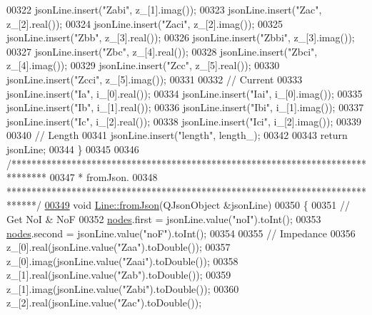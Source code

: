 \begin{DoxyCode}
00322   jsonLine.insert(\textcolor{stringliteral}{"Zabi"}, z\_[1].imag());
00323   jsonLine.insert(\textcolor{stringliteral}{"Zac"}, z\_[2].real());
00324   jsonLine.insert(\textcolor{stringliteral}{"Zaci"}, z\_[2].imag());
00325   jsonLine.insert(\textcolor{stringliteral}{"Zbb"}, z\_[3].real());
00326   jsonLine.insert(\textcolor{stringliteral}{"Zbbi"}, z\_[3].imag());
00327   jsonLine.insert(\textcolor{stringliteral}{"Zbc"}, z\_[4].real());
00328   jsonLine.insert(\textcolor{stringliteral}{"Zbci"}, z\_[4].imag());
00329   jsonLine.insert(\textcolor{stringliteral}{"Zcc"}, z\_[5].real());
00330   jsonLine.insert(\textcolor{stringliteral}{"Zcci"}, z\_[5].imag());
00331 
00332   \textcolor{comment}{// Current}
00333   jsonLine.insert(\textcolor{stringliteral}{"Ia"}, i\_[0].real());
00334   jsonLine.insert(\textcolor{stringliteral}{"Iai"}, i\_[0].imag());
00335   jsonLine.insert(\textcolor{stringliteral}{"Ib"}, i\_[1].real());
00336   jsonLine.insert(\textcolor{stringliteral}{"Ibi"}, i\_[1].imag());
00337   jsonLine.insert(\textcolor{stringliteral}{"Ic"}, i\_[2].real());
00338   jsonLine.insert(\textcolor{stringliteral}{"Ici"}, i\_[2].imag());
00339 
00340   \textcolor{comment}{// Length}
00341   jsonLine.insert(\textcolor{stringliteral}{"length"}, length\_);
00342 
00343   \textcolor{keywordflow}{return} jsonLine;
00344 \}
00345 
00346 \textcolor{comment}{/*******************************************************************************}
00347 \textcolor{comment}{ * fromJson.}
00348 \textcolor{comment}{ ******************************************************************************/}
\hypertarget{line_8cpp_source_l00349}{}\hyperlink{group___models_ga62623ad71df5279377cc69da90decc75}{00349} \textcolor{keywordtype}{void} \hyperlink{group___models_ga62623ad71df5279377cc69da90decc75}{Line::fromJson}(QJsonObject &jsonLine)
00350 \{
00351   \textcolor{comment}{// Get NoI & NoF}
00352   \hyperlink{class_line_afd17c40d656e6a8d677cb22df5f0c70b}{nodes}.first = jsonLine.value(\textcolor{stringliteral}{"noI"}).toInt();
00353   \hyperlink{class_line_afd17c40d656e6a8d677cb22df5f0c70b}{nodes}.second = jsonLine.value(\textcolor{stringliteral}{"noF"}).toInt();
00354 
00355   \textcolor{comment}{// Impedance}
00356   z\_[0].real(jsonLine.value(\textcolor{stringliteral}{"Zaa"}).toDouble());
00357   z\_[0].imag(jsonLine.value(\textcolor{stringliteral}{"Zaai"}).toDouble());
00358   z\_[1].real(jsonLine.value(\textcolor{stringliteral}{"Zab"}).toDouble());
00359   z\_[1].imag(jsonLine.value(\textcolor{stringliteral}{"Zabi"}).toDouble());
00360   z\_[2].real(jsonLine.value(\textcolor{stringliteral}{"Zac"}).toDouble());

\end{DoxyCode}
